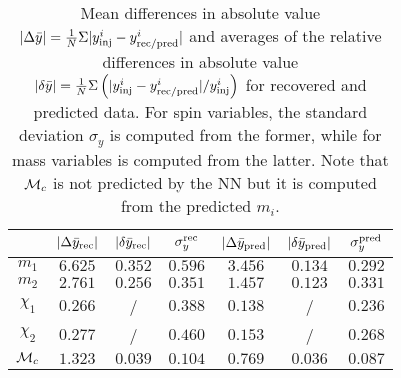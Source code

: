 \begin{table}
  \caption{\label{tab:NN_errors}  Mean differences in absolute value $|\Delta \bar{y}|=  \frac{1}{N} \Sigma |y^i_{\rm inj} - y^i_{\rm rec/pred}|$
  and averages of the relative
  differences in absolute value $|\delta \bar{y}| = \frac{1}{N} \Sigma \left( |y^i_{\rm inj} - y^i_{\rm rec/pred}|/y^i_{\rm inj} \right) $ for recovered and predicted data.
  For spin variables, the standard deviation $\sigma_y$ is computed from the former, while for mass variables is computed from the latter.
  Note that ${\cal{M}}_c$ is not predicted by the NN but it is computed from the predicted $m_i$.}
  \begin{center}
  \begin{tabular}{c|ccc|ccc}
  \hline\hline
  & $|\Delta \bar{y}_{\rm rec}|$  & $|\delta \bar{y}_{\rm rec}|$  & $\sigma_y^{\rm rec}$ &
     $|\Delta \bar{y}_{\rm pred}|$ & $|\delta \bar{y}_{\rm pred}|$ & $\sigma_y^{\rm pred}$ \\
  \hline\hline
$m_1$          & $6.625$ & $0.352$ & $0.596$ & $3.456$ & $0.134$ & $0.292$ \\
$m_2$          & $2.761$ & $0.256$ & $0.351$ & $1.457$ & $0.123$ & $0.331$ \\
$\chi_1$       & $0.266$ &  /  & $0.388$ & $0.138$ &  /  & $0.236$ \\
$\chi_2$       & $0.277$ &  /  & $0.460$ & $0.153$ &  /  & $0.268$ \\
\hline
${\cal{M}}_c$  & $1.323$ & $0.039$ & $0.104$ & $0.769$ & $0.036$ & $0.087$ \\
  \hline\hline
\end{tabular}
\end{center}
\end{table}

